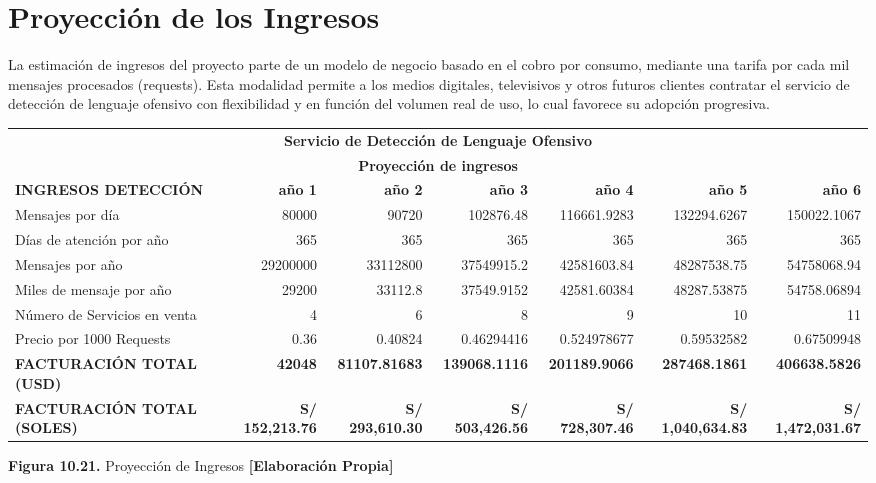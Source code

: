 \section{Proyección de los Ingresos}

La estimación de ingresos del proyecto parte de un modelo de negocio basado en el cobro por consumo, mediante una tarifa por cada mil mensajes procesados (requests). Esta modalidad permite a los medios digitales, televisivos y otros futuros clientes contratar el servicio de detección de lenguaje ofensivo con flexibilidad y en función del volumen real de uso, lo cual favorece su adopción progresiva.

\begin{table}[H]
\centering
\scriptsize
\renewcommand{\arraystretch}{1.15}
\setlength{\tabcolsep}{3pt}
\begin{tabular}{|l|r|r|r|r|r|r|}
\hline
\multicolumn{7}{|c|}{\textbf{Servicio de Detección de Lenguaje Ofensivo}} \\ 
\multicolumn{7}{|c|}{\textbf{Proyección de ingresos}} \\ \hline
\textbf{INGRESOS DETECCIÓN} & \textbf{año 1} & \textbf{año 2} & \textbf{año 3} & \textbf{año 4} & \textbf{año 5} & \textbf{año 6} \\ \hline
Mensajes por día & 80000 & 90720 & 102876.48 & 116661.9283 & 132294.6267 & 150022.1067 \\ \hline
Días de atención por año & 365 & 365 & 365 & 365 & 365 & 365 \\ \hline
Mensajes por año & 29200000 & 33112800 & 37549915.2 & 42581603.84 & 48287538.75 & 54758068.94 \\ \hline
Miles de mensaje por año & 29200 & 33112.8 & 37549.9152 & 42581.60384 & 48287.53875 & 54758.06894 \\ \hline
Número de Servicios en venta & 4 & 6 & 8 & 9 & 10 & 11 \\ \hline
Precio por 1000 Requests & 0.36 & 0.40824 & 0.46294416 & 0.524978677 & 0.59532582 & 0.67509948 \\ \hline
\textbf{FACTURACIÓN TOTAL (USD)} & \textbf{42048} & \textbf{81107.81683} & \textbf{139068.1116} & \textbf{201189.9066} & \textbf{287468.1861} & \textbf{406638.5826} \\ \hline
\textbf{FACTURACIÓN TOTAL (SOLES)} & \textbf{S/ 152,213.76} & \textbf{S/ 293,610.30} & \textbf{S/ 503,426.56} & \textbf{S/ 728,307.46} & \textbf{S/ 1,040,634.83} & \textbf{S/ 1,472,031.67} \\ \hline
\end{tabular}

\vspace{0.2cm}
\textbf{Figura 10.21.} Proyección de Ingresos \textbf{[Elaboración Propia]}
\end{table}
